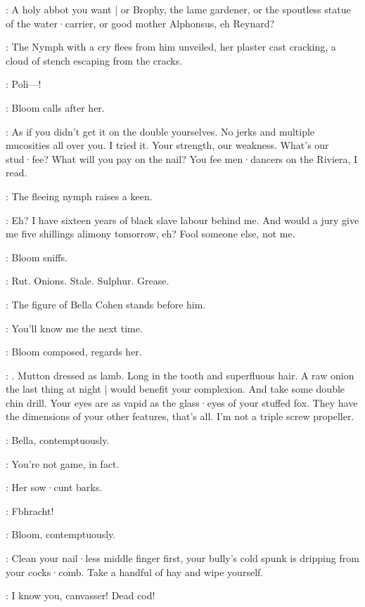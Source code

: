 \Bloom:
A holy abbot you want |
or Brophy,
the lame gardener,
or the spoutless statue of the water·carrier,
or good mother Alphonsus,
eh Reynard?

:
The Nymph with a cry flees from him unveiled,
her plaster cast cracking,
a cloud of stench escaping from the cracks.

\Nymph:
Poli---!

:
Bloom calls after her.

\Bloom:
As if you didn't get it on the double yourselves.
No jerks and multiple mucosities all over you.
I tried it.
Your strength,
our weakness.
What's our stud·fee?
What will you pay on the nail?
You fee men·dancers on the Riviera,
I read.

:
The fleeing nymph raises a keen.

\Bloom:
Eh?
I have sixteen years of black slave labour behind me.
And would a jury give me five shillings alimony tomorrow,
eh?
Fool someone else,
not me.

:
Bloom sniffs.

\Bloom:
Rut. Onions. Stale. Sulphur. Grease.


:
The figure of Bella Cohen stands before him.

\Bella:
You'll know me the next time.

:
Bloom composed,
regards her.

\Bloom:
.
Mutton dressed as lamb.
Long in the tooth and superfluous hair.
A raw onion the last thing at night |
would benefit your complexion.
And take some double chin drill.
Your eyes are as vapid as the glass·eyes of your stuffed fox.
They have the dimensions of your other features,
that's all.
I'm not a triple screw propeller.

:
Bella,
contemptuously.

\Bella:
You're not game,
in fact.

:
Her sow·cunt barks.

\Bella:
Fbhracht!%

:
Bloom,
contemptuously.

\Bloom:
Clean your nail·less middle finger first,
your bully's cold spunk is dripping from your cocks·comb.
Take a handful of hay and wipe yourself.

\Bella:
I know you,
canvasser!
Dead cod!

